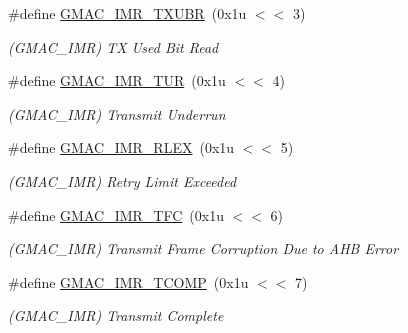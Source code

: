 \begin{DoxyCompactItemize}
\mbox{\label{group__SAME70__GMAC_ga3784399fa2d8ec98800a377cd6b6c2f5}} 
\#define \mbox{\hyperlink{group__SAME70__GMAC_ga3784399fa2d8ec98800a377cd6b6c2f5}{G\+M\+A\+C\+\_\+\+I\+M\+R\+\_\+\+T\+X\+U\+BR}}~(0x1u $<$$<$ 3)
\begin{DoxyCompactList}\small\item\em (G\+M\+A\+C\+\_\+\+I\+MR) TX Used Bit Read \end{DoxyCompactList}\item 
\mbox{\label{group__SAME70__GMAC_ga8ccda744799153a2985379c55e96be16}} 
\#define \mbox{\hyperlink{group__SAME70__GMAC_ga8ccda744799153a2985379c55e96be16}{G\+M\+A\+C\+\_\+\+I\+M\+R\+\_\+\+T\+UR}}~(0x1u $<$$<$ 4)
\begin{DoxyCompactList}\small\item\em (G\+M\+A\+C\+\_\+\+I\+MR) Transmit Underrun \end{DoxyCompactList}\item 
\mbox{\label{group__SAME70__GMAC_gac31ce1c4747e9043cffdfde721ec2e08}} 
\#define \mbox{\hyperlink{group__SAME70__GMAC_gac31ce1c4747e9043cffdfde721ec2e08}{G\+M\+A\+C\+\_\+\+I\+M\+R\+\_\+\+R\+L\+EX}}~(0x1u $<$$<$ 5)
\begin{DoxyCompactList}\small\item\em (G\+M\+A\+C\+\_\+\+I\+MR) Retry Limit Exceeded \end{DoxyCompactList}\item 
\mbox{\label{group__SAME70__GMAC_ga6dea46fe367a83e1f98da17dc9052ef9}} 
\#define \mbox{\hyperlink{group__SAME70__GMAC_ga6dea46fe367a83e1f98da17dc9052ef9}{G\+M\+A\+C\+\_\+\+I\+M\+R\+\_\+\+T\+FC}}~(0x1u $<$$<$ 6)
\begin{DoxyCompactList}\small\item\em (G\+M\+A\+C\+\_\+\+I\+MR) Transmit Frame Corruption Due to A\+HB Error \end{DoxyCompactList}\item 
\mbox{\label{group__SAME70__GMAC_ga8d6355192d70c07da2c8b8986d06234f}} 
\#define \mbox{\hyperlink{group__SAME70__GMAC_ga8d6355192d70c07da2c8b8986d06234f}{G\+M\+A\+C\+\_\+\+I\+M\+R\+\_\+\+T\+C\+O\+MP}}~(0x1u $<$$<$ 7)
\begin{DoxyCompactList}\small\item\em (G\+M\+A\+C\+\_\+\+I\+MR) Transmit Complete \end{DoxyCompactList}\item 
$$
\end{DoxyCompactItemize}
